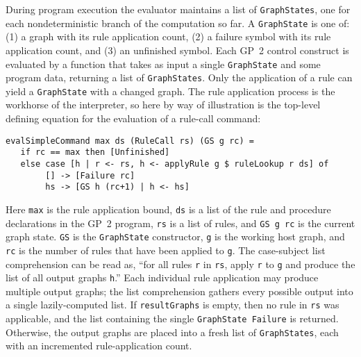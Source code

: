 During program execution the evaluator maintains a list of \texttt{GraphStates}, one for each nondeterministic branch of the computation so far. A \texttt{GraphState} is one of: (1) a graph with its rule application count, (2) a failure symbol with its rule application count, and (3) an unfinished symbol. Each GP~2 control construct is evaluated by a function that takes as input a single \texttt{GraphState} and some program data, returning a list of \texttt{GraphStates}. Only the application of a rule can yield a \texttt{GraphState} with a changed graph.
The rule application process is the workhorse of the interpreter, so here by way of illustration is the
top-level defining equation for the evaluation of a rule-call command:

\begin{verbatim}
evalSimpleCommand max ds (RuleCall rs) (GS g rc) = 
   if rc == max then [Unfinished]
   else case [h | r <- rs, h <- applyRule g $ ruleLookup r ds] of
        [] -> [Failure rc]
        hs -> [GS h (rc+1) | h <- hs]
\end{verbatim}

Here \texttt{max} is the rule application bound, \texttt{ds} is a list of the rule and procedure declarations in the GP~2 program, \texttt{rs} is a list of rules, and \texttt{GS g rc} is the current graph state. \texttt{GS} is the \texttt{GraphState} constructor, \texttt{g} is the working host graph, and \texttt{rc} is the number of rules that have been applied to \texttt{g}. The case-subject list comprehension can be read as, ``for all rules \texttt{r} in \texttt{rs}, apply \texttt{r} to \texttt{g} and produce the list of all output graphs \texttt{h}.'' Each individual rule application may produce multiple output graphs; the list comprehension gathers every possible output into a single lazily-computed list. If \texttt{resultGraphs} is empty, then no rule in \texttt{rs} was applicable, and the list containing the single \texttt{GraphState Failure} is returned. Otherwise, the output graphs are placed into a fresh list of \texttt{GraphStates}, each with an incremented rule-application count.


